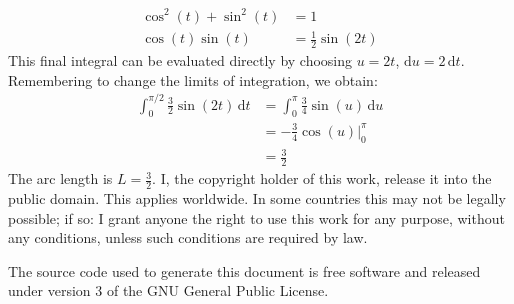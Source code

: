 \documentclass{article}
\begin{document}
        \begin{subequations}
            \begin{align}
                \cos^{2}(t)+\sin^{2}(t)&=1\\
                \cos(t)\sin(t)&=\frac{1}{2}\sin(2t)
            \end{align}
        \end{subequations}
        This final integral can be evaluated directly
        by choosing $u=2t$, $\textrm{d}u=2\,\textrm{d}t$.
        Remembering to change the limits of integration, we obtain:
        \begin{subequations}
            \begin{align}
                \int_{0}^{\pi/2}\frac{3}{2}\sin(2t)\,\textrm{d}t
                &=\int_{0}^{\pi}\frac{3}{4}\sin(u)\,\textrm{d}u\\
                &=-\frac{3}{4}\cos(u)\Big|_{0}^{\pi}\\
                &=\frac{3}{2}
            \end{align}
        \end{subequations}
        The arc length is $L=\frac{3}{2}$.
        \color{black}
    \fi
    \newpage
    I, the copyright holder of this work, release it into the public domain.
    This applies worldwide. In some countries this may not be legally possible;
    if so: I grant anyone the right to use this work for any purpose, without
    any conditions, unless such conditions are required by law.
    \par\hfill\par
    The source code used to generate this document is free software and released
    under version 3 of the GNU General Public License.
\end{document}
